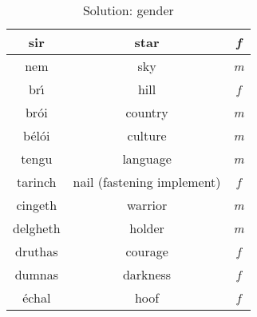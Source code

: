 \begin{table}[H]
{{\begin{tabular}{|c|c|>{\itshape}c|}
      \midrule
      sir & star & f\\
      \midrule
      nem & sky & m\\
      \midrule
      br\'{\i} & hill & f\\
      \midrule
      br\'{o}i & country & m\\
      \midrule
      b\'{e}l\'{o}i & culture & m\\
      \midrule
      tengu & language & m\\
      \midrule
      tarinch & nail (fastening implement) & f\\
      \midrule
      cingeth & warrior & m\\
      \midrule
      delgheth & holder & m\\
      \midrule
      druthas & courage & f\\
      \midrule
      dumnas & darkness & f\\
      \'{e}chal & hoof & f\\
      \bottomrule
    \end{tabular}
  }
}
\label{solution_gender}
\caption{Solution: gender}
\end{table}
